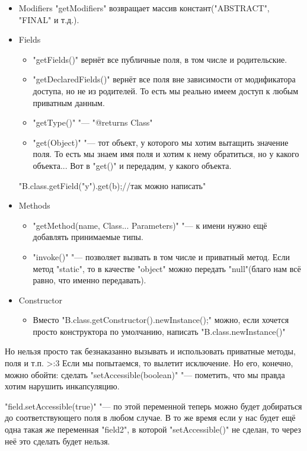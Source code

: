 \begin{itemize}
	\item{Modifiers}
		\java"getModifiers" возвращает массив констант(\java"ABSTRACT", \java"FINAL" и т.д.).
	\item{Fields}
		\begin{itemize}
			\item
				\java"getFields()" вернёт все публичные поля, в том числе и родительские.
			\item
				\java"getDeclaredFields()" вернёт все поля вне зависимости от модификатора доступа, но не из родителей. 
				То есть мы реально имеем доступ к любым приватным данным.
			\item
				\java"getType()" "--- \java"@returns Class"
			\item
				\java"get(Object)" "--- тот объект, у которого мы хотим вытащить значение поля.
				То есть мы знаем имя поля и хотим к нему обратиться, но у какого объекта...
				Вот в \java"get()" и передадим, у какого объекта.
		\end{itemize}
		\java"B.class.getField("y").get(b);//так можно написать"
	\item{Methods}
		\begin{itemize}
			\item
				\java"getMethod(name, Class... Parameters)" "--- к имени нужно ещё добавлять принимаемые типы.
			\item	
				\java"invoke()" "--- позволяет вызвать в том числе и приватный метод. Если метод \java"static", 
				то в качестве \java"object" можно передать \java"null"(благо нам всё равно, что именно передавать).
		\end{itemize}
	\item{Constructor}
		\begin{itemize}
			\item
				Вместо \java"B.class.getConstructor().newInstance();" можно, 
				если хочется просто конструктора по умолчанию, написать \java"B.class.newInstance()"
		\end{itemize}
\end{itemize}

Но нельзя просто так безнаказанно вызывать и использовать приватные методы, поля и т.п. >:3
Если мы попытаемся, то вылетит исключение.
Но его, конечно, можно обойти: сделать \java"setAccessible(boolean)" "--- пометить, что мы правда хотим нарушить инкапсуляцию.

\java"field.setAccessible(true)" "--- по этой переменной теперь можно будет добираться до соответствующего поля в любом случае.
В то же время если у нас будет ещё одна такая же переменная \java"field2", в которой \java"setAccessible()" не сделан, 
то через неё это сделать будет нельзя.

